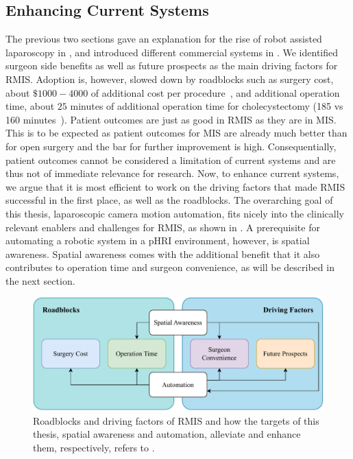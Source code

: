 \subsection{Enhancing Current Systems}
\label{in:sec:enhancing_current_systems}
The previous two sections gave an explanation for the rise of robot assisted laparoscopy in , and introduced different commercial systems in . We identified surgeon side benefits as well as future prospects as the main driving factors for RMIS. Adoption is, however, slowed down by roadblocks such as surgery cost, about $\$1000-4000$ of additional cost per procedure~\cite{neumann2018qalys}, and additional operation time, about $25$ minutes of additional operation time for cholecystectomy (185 vs 160 minutes~\cite{kane2020robotic}). Patient outcomes are just as good in RMIS as they are in MIS. This is to be expected as patient outcomes for MIS are already much better than for open surgery and the bar for further improvement is high. Consequentially, patient outcomes cannot be considered a limitation of current systems and are thus not of immediate relevance for research. Now, to enhance current systems, we argue that it is most efficient to work on the driving factors that made RMIS successful in the first place, as well as the roadblocks. The overarching goal of this thesis, laparoscopic camera motion automation, fits nicely into the clinically relevant enablers and challenges for RMIS, as shown in . A prerequisite for automating a robotic system in a pHRI environment, however, is spatial awareness. Spatial awareness comes with the additional benefit that it also contributes to operation time and surgeon convenience, as will be described in the next section.
\begin{figure}[tb]
    \centering
    \includegraphics[width=\textwidth]{introduction/fig/main_goals.pdf}
    \caption{Roadblocks and driving factors of RMIS and how the targets of this thesis, spatial awareness and automation, alleviate and enhance them, respectively, refers to .}
    \label{in:fig:advancing_robotic_laparoscopy}
\end{figure}

